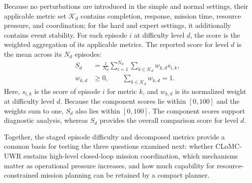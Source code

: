 Because no perturbations are introduced in the simple and normal settings,
their applicable metric set $\mathcal{K}_d$ contains completion, response,
mission time, resource pressure, and coordination; for the hard and expert
settings, it additionally contains event stability.
For each episode $i$ at difficulty level $d$, the score is the weighted
aggregation of its applicable metrics. The reported score for level $d$ is the
mean across its $N_d$ episodes:
\begin{equation}
\begin{aligned}
S_d
&=\frac{1}{N_d}\sum_{i=1}^{N_d}
\sum_{k\in\mathcal{K}_d}w_{k,d}s_{i,k},\\
w_{k,d}&\geq0,\qquad
\sum_{k\in\mathcal{K}_d}w_{k,d}=1.
\end{aligned}
\label{eq:final-evaluation-score}
\end{equation}
Here, $s_{i,k}$ is the score of episode $i$ for metric $k$, and $w_{k,d}$
is its normalized weight at difficulty level $d$. Because the component scores
lie within $[0,100]$ and the weights sum to one, $S_d$ also lies within $[0,100]$.
The component scores support diagnostic analysis, whereas $S_d$ provides the
overall comparison score for level $d$.

Together, the staged episode difficulty and decomposed metrics provide a common
basis for testing the three questions examined next: whether CLoMC-UWR sustains
high-level closed-loop mission coordination, which mechanisms
matter as operational pressure increases, and how much capability for
resource-constrained mission planning can be retained by a compact planner.

\endinput
